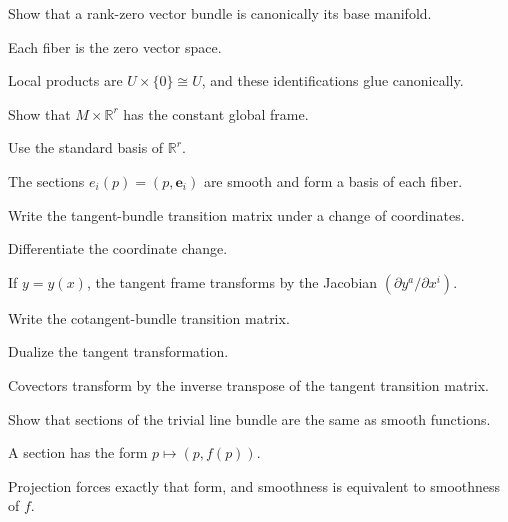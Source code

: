 \begin{exercise}\label{exr:vii07-05}
Show that a rank-zero vector bundle is canonically its base manifold.
\end{exercise}
\begin{hint}
Each fiber is the zero vector space.
\end{hint}
\begin{solution}
Local products are \(U\times\{0\}\cong U\), and these identifications glue canonically.
\end{solution}

\begin{exercise}\label{exr:vii07-06}
Show that \(M\times\mathbb R^r\) has the constant global frame.
\end{exercise}
\begin{hint}
Use the standard basis of \(\mathbb R^r\).
\end{hint}
\begin{solution}
The sections \(e_i(p)=(p,\mathbf e_i)\) are smooth and form a basis of each fiber.
\end{solution}

\begin{exercise}\label{exr:vii07-07}
Write the tangent-bundle transition matrix under a change of coordinates.
\end{exercise}
\begin{hint}
Differentiate the coordinate change.
\end{hint}
\begin{solution}
If \(y=y(x)\), the tangent frame transforms by the Jacobian \((\partial y^a/\partial x^i)\).
\end{solution}

\begin{exercise}\label{exr:vii07-08}
Write the cotangent-bundle transition matrix.
\end{exercise}
\begin{hint}
Dualize the tangent transformation.
\end{hint}
\begin{solution}
Covectors transform by the inverse transpose of the tangent transition matrix.
\end{solution}

\begin{exercise}\label{exr:vii07-09}
Show that sections of the trivial line bundle are the same as smooth functions.
\end{exercise}
\begin{hint}
A section has the form \(p\mapsto(p,f(p))\).
\end{hint}
\begin{solution}
Projection forces exactly that form, and smoothness is equivalent to smoothness of \(f\).
\end{solution}

